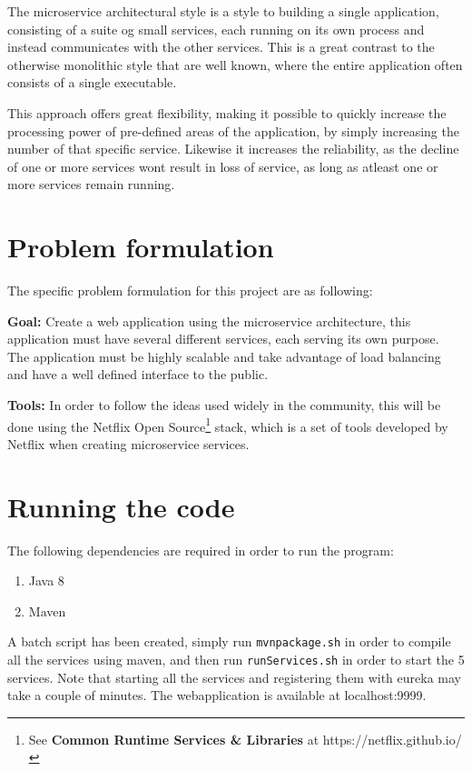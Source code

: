 \documentclass[a4paper,11pt,oneside]{book}
\begin{document}
The microservice architectural style is a style to building a single application, consisting of a suite og small services, each running on its own process and instead communicates with the other services. This is a great contrast to the otherwise monolithic style that are well known, where the entire application often consists of a single executable.

This approach offers great flexibility, making it possible to quickly increase the processing power of pre-defined areas of the application, by simply increasing the number of that specific service. Likewise it increases the reliability, as the decline of one or more services wont result in loss of service, as long as atleast one or more services remain running.

\section{Problem formulation}
The specific problem formulation for this project are as following:

\textbf{Goal:} Create a web application using the microservice architecture, this application must have several different services, each serving its own purpose. The application must be highly scalable and take advantage of load balancing and have a well defined interface to the public.

\textbf{Tools:} In order to follow the ideas used widely in the community, this will be done using the Netflix Open Source\footnote{See \textbf{Common Runtime Services \& Libraries} at https://netflix.github.io/} stack, which is a set of tools developed by Netflix when creating microservice services.

\section{Running the code}
The following dependencies are required in order to run the program:
\begin{enumerate}
\item Java 8
\item Maven
\end{enumerate}

A batch script has been created, simply run \texttt{mvnpackage.sh} in order to compile all the services using maven, and then run \texttt{runServices.sh} in order to start the 5 services. Note that starting all the services and registering them with eureka may take a couple of minutes. The webapplication is available at localhost:9999.
\end{document}
